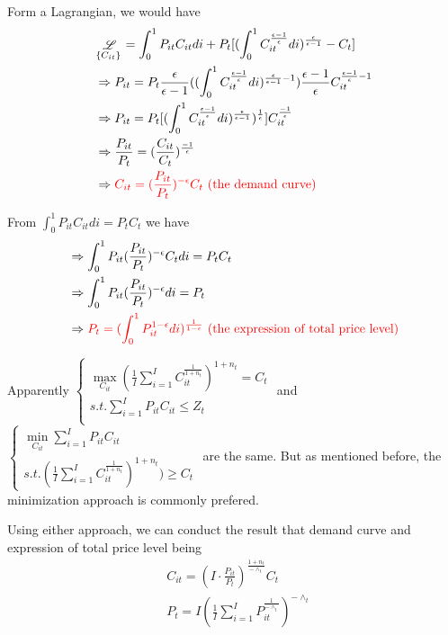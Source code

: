 \documentclass{article}
\begin{document}
Form a Lagrangian, we would have
\begin{align}
&\mathop{\mathscr{L}}\limits_{\{C_{it}\}} =\int_{0}^{1} P_{it}C_{it}di+P_{t}[(\int_{0}^{1}C_{it}^{\frac{\epsilon-1}{\epsilon}}di)^{\frac{\epsilon}{\epsilon-1}}-C_{t}]
\\&\Rightarrow P_{it}=P_{t}\frac{\epsilon}{\epsilon-1}((\int_{0}^{1}C_{it}^{\frac{\epsilon-1}{\epsilon}}di)^{\frac{\epsilon}{\epsilon-1}-1})\frac{\epsilon-1}{\epsilon} C_{it}^{\frac{\epsilon-1}{\epsilon}-1}
\\&\Rightarrow P_{it}=P_{t}[(\int_{0}^{1}C_{it}^{\frac{\epsilon-1}{\epsilon}}di)^{\frac{\epsilon}{\epsilon-1}})^{\frac{1}{\epsilon}}]C_{it}^{\frac{-1}{\epsilon}}
\\&\Rightarrow \frac{P_{it}}{P_{t}}=(\frac{C_{it}}{C_{t}})^{\frac{-1}{\epsilon}}
\\&\Rightarrow \color{red} C_{it}=(\frac{P_{it}}{P_{t}})^{-\epsilon}C_{t} \text{ (the demand curve)}
\end{align}


From $\int_{0}^{1} P_{it}C_{it}di =P_{t}C_{t}$ we have
\begin{align}
&\Rightarrow \int_{0}^{1} P_{it}(\frac{P_{it}}{P_{t}})^{-\epsilon}C_{t} di=P_{t}C_{t}
\\&\Rightarrow \int_{0}^{1} P_{it}(\frac{P_{it}}{P_{t}})^{-\epsilon} di=P_{t}
\\&\Rightarrow \color{red} P_{t}=(\int_{0}^{1}P_{it}^{1-\epsilon}di)^{\frac{1}{1-\epsilon}} \text{ (the expression of total price level)}
\end{align}

Apparently
$\begin{cases}
\max\limits_{C_{it}}(\frac{1}{I}\sum\limits_{i=1}^{I}C_{it}^{\frac{1}{1+n_{t}}})^{1+n_{t}}=C_{t}
\\
s.t. \sum\limits_{i=1}^{I}P_{it} C_{it}\leqslant Z_{t} \\
\end{cases}$
and
$\begin{cases} \min\limits_{C_{it}}\sum\limits_{i=1}^{I}P_{it}C_{it} \\
s.t. (\frac{1}{I}\sum\limits_{i=1}^{I}C_{it}^{\frac{1}{1+n_{t}}})^{1+n_{t}})\geqslant C_{t}
\end{cases}$
are the same. But as mentioned before, the minimization approach is commonly prefered.


Using either approach, we can conduct the result that demand curve and expression of total price level being
\begin{align}
&C_{it}=(I\cdot \frac{P_{it}}{P_{t}})^{\frac{1+n_{t}}{-\wedge_t}}C_{t}
\\&P_{t}=I(\frac{1}{I}\sum\limits_{i=1}^{I}P_{it}^\frac{1}{-\wedge_t})^{-\wedge_t}
\end{align}
\end{document}
